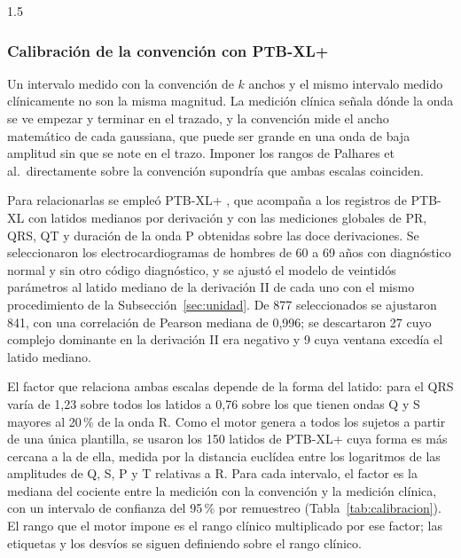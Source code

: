 \begin{spacing}{1.5}
\subsubsection{Calibración de la convención con PTB-XL+}\label{sec:calibracion}

Un intervalo medido con la convención de $k$ anchos y el mismo intervalo medido clínicamente no son la misma magnitud. La medición clínica señala dónde la onda se ve empezar y terminar en el trazado, y la convención mide el ancho matemático de cada gaussiana, que puede ser grande en una onda de baja amplitud sin que se note en el trazo. Imponer los rangos de Palhares et al.\ directamente sobre la convención supondría que ambas escalas coinciden.

Para relacionarlas se empleó PTB-XL+ \cite{strodthoff2023ptbxlplus}, que acompaña a los registros de PTB-XL \cite{wagner2020ptbxl} con latidos medianos por derivación y con las mediciones globales de PR, QRS, QT y duración de la onda P obtenidas sobre las doce derivaciones. Se seleccionaron los electrocardiogramas de hombres de 60 a 69 años con diagnóstico normal y sin otro código diagnóstico, y se ajustó el modelo de veintidós parámetros al latido mediano de la derivación II de cada uno con el mismo procedimiento de la Subsección~\ref{sec:unidad}. De 877 seleccionados se ajustaron 841, con una correlación de Pearson mediana de 0,996; se descartaron 27 cuyo complejo dominante en la derivación II era negativo y 9 cuya ventana excedía el latido mediano.

El factor que relaciona ambas escalas depende de la forma del latido: para el QRS varía de 1,23 sobre todos los latidos a 0,76 sobre los que tienen ondas Q y S mayores al 20\,\% de la onda R. Como el motor genera a todos los sujetos a partir de una única plantilla, se usaron los 150 latidos de PTB-XL+ cuya forma es más cercana a la de ella, medida por la distancia euclídea entre los logaritmos de las amplitudes de Q, S, P y T relativas a R. Para cada intervalo, el factor es la mediana del cociente entre la medición con la convención y la medición clínica, con un intervalo de confianza del 95\,\% por remuestreo (Tabla~\ref{tab:calibracion}). El rango que el motor impone es el rango clínico multiplicado por ese factor; las etiquetas y los desvíos se siguen definiendo sobre el rango clínico.


\end{spacing}
